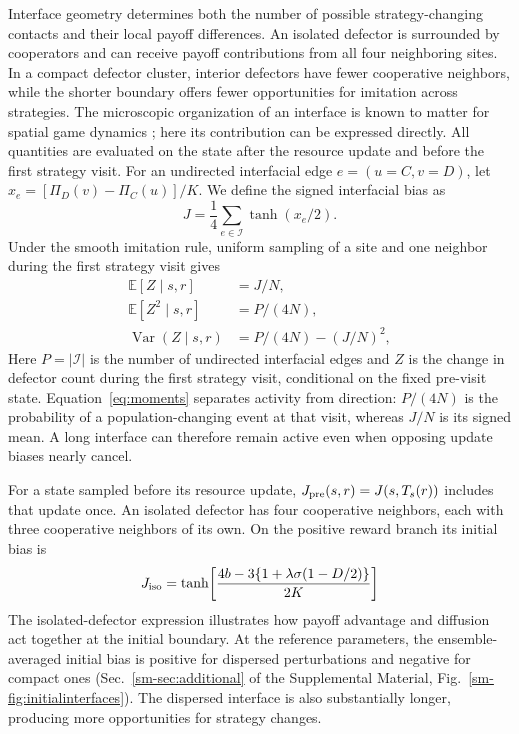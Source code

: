 Interface geometry determines both the number of possible strategy-changing contacts and their local payoff differences. An isolated defector is surrounded by cooperators and can receive payoff contributions from all four neighboring sites. In a compact defector cluster, interior defectors have fewer cooperative neighbors, while the shorter boundary offers fewer opportunities for imitation across strategies. The microscopic organization of an interface is known to matter for spatial game dynamics \cite{roca2009imitation}; here its contribution can be expressed directly. All quantities are evaluated on the state after the resource update and before the first strategy visit. For an undirected interfacial edge $e=(u=C,v=D)$, let $x_e=[\Pi_D(v)-\Pi_C(u)]/K$. We define the signed interfacial bias as
\begin{equation}
\label{eq:J}
J=\frac14\sum_{e\in\mathcal I}\tanh(x_e/2).
\end{equation}
Under the smooth imitation rule, uniform sampling of a site and one neighbor during the first strategy visit gives
\begin{equation}
\label{eq:moments}
\begin{aligned}
\mathbb E[Z\mid s,r]&=J/N,\\
\mathbb E[Z^2\mid s,r]&=P/(4N),\\
\operatorname{Var}(Z\mid s,r)&=P/(4N)-(J/N)^2,
\end{aligned}
\end{equation}
Here $P=|\mathcal I|$ is the number of undirected interfacial edges and $Z$ is the change in defector count during the first strategy visit, conditional on the fixed pre-visit state. Equation~\eqref{eq:moments} separates activity from direction: $P/(4N)$ is the probability of a population-changing event at that visit, whereas $J/N$ is its signed mean. A long interface can therefore remain active even when opposing update biases nearly cancel.

For a state sampled before its resource update, $J_{\rm pre}(s,r)=J(s,T_s(r))$ includes that update once. An isolated defector has four cooperative neighbors, each with three cooperative neighbors of its own. On the positive reward branch its initial bias is
\begin{equation}
\label{eq:isolated}
J_{\rm iso}=
\tanh\!\left[
\frac{4b-3\{1+\lambda\sigma(1-D/2)\}}{2K}
\right]
\end{equation}
The isolated-defector expression illustrates how payoff advantage and diffusion act together at the initial boundary. At the reference parameters, the ensemble-averaged initial bias is positive for dispersed perturbations and negative for compact ones (Sec.~\ref{sm-sec:additional} of the Supplemental Material, Fig.~\ref{sm-fig:initialinterfaces}). The dispersed interface is also substantially longer, producing more opportunities for strategy changes.

